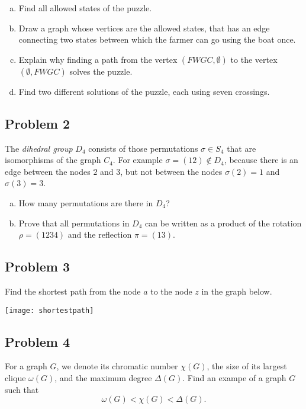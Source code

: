 \documentclass{amsart}
\theoremstyle{definition} \newtheorem*{definition}{Definition}
\theoremstyle{remark} \newtheorem*{ex}{Example}
\begin{document}
\begin{enumerate}[a)]
\item Find all allowed states of the puzzle.
\item Draw a graph whose vertices
are the allowed states, that has an edge connecting two states between which the farmer can go using the boat once.
\item Explain why finding a path from the vertex $(FWGC,\emptyset)$ to the vertex  $(\emptyset, FWGC)$
solves the puzzle.
\item Find two different solutions of the puzzle, each using
seven crossings.
\end{enumerate}


\subsection*{Problem 2}
The {\em dihedral group} $D_4$ consists of those permutations $\sigma\in S_4$ that are isomorphisms of the graph $C_4$.
For example $\sigma=(12)\not\in D_4$, because there is an edge between the nodes $2$ and $3$, but not between the nodes $\sigma(2)=1$ and $\sigma(3)=3$.
\begin{center}
\end{center}
\begin{enumerate}[a)]  
\item  How many permutations are there in $D_4$?
\item Prove that all permutations in $D_4$ can be written as a product of the rotation $\rho=(1234)$ and the reflection $\pi=(13)$.
\end{enumerate}

\subsection*{Problem 3}
Find the shortest path from the node $a$ to the node $z$ in the graph below.
\begin{center}
\texttt{[image: shortestpath]}
\end{center}

\subsection*{Problem 4}
For a graph $G$, we denote its chromatic number $\chi(G)$, the size of its largest clique $\omega(G)$, and the maximum degree $\Delta(G)$. Find an exampe of a graph $G$ such that $$\omega(G)<\chi(G)<\Delta(G).$$ 
\end{document}
